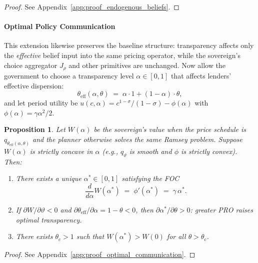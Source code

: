 \documentclass[12pt]{article}
\theoremstyle{plain}
\newtheorem{proposition}{Proposition}
\begin{document}
\begin{proof}
	See Appendix~\ref{app:proof_endogenous_beliefs}.
\end{proof}

\paragraph{Optimal Policy Communication}
This extension likewise preserves the baseline structure: transparency affects
only the \emph{effective} belief input into the same pricing operator, while
the sovereign's choice aggregator $J_\rho$ and other primitives are unchanged.
Now allow the government to choose a transparency level $\alpha\in[0,1]$ that
affects lenders' effective dispersion:
\begin{equation}
	\theta_{\mathrm{eff}}(\alpha,\theta)\;=\;\alpha\cdot 1 + (1-\alpha)\cdot \theta,
	\label{eq:effective_theta}
\end{equation}
and let period utility be $u(c,\alpha)=c^{1-\sigma}/(1-\sigma)-\phi(\alpha)$ with $\phi(\alpha)=\gamma\alpha^2/2$.

\begin{proposition}\label{prop:optimal_communication}
	Let $W(\alpha)$ be the sovereign's value when the price schedule is $q_{\theta_{\mathrm{eff}}(\alpha,\theta)}$ and the planner otherwise solves the same Ramsey problem. Suppose $W(\alpha)$ is strictly concave in $\alpha$ (e.g., $q_\vartheta$ is smooth and $\phi$ is strictly convex). Then:
	\begin{enumerate}
		\item[\textbf{(i)}] There exists a unique $\alpha^*\in[0,1]$ satisfying the FOC
		      \begin{equation}
			      \frac{d}{d\alpha}W(\alpha^*) \;=\; \phi'(\alpha^*) \;=\; \gamma\,\alpha^*.
			      \label{eq:foc_transparency}
		      \end{equation}
		\item[\textbf{(ii)}] If $\partial W/\partial \vartheta<0$ and $\partial \theta_{\mathrm{eff}}/\partial \alpha=1-\theta<0$, then $\partial \alpha^*/\partial \theta>0$: greater PRO raises optimal transparency.
		\item[\textbf{(iii)}] There exists $\theta_c>1$ such that $W(\alpha^*)>W(0)$ for all $\theta>\theta_c$.
	\end{enumerate}
\end{proposition}

\begin{proof}
	See Appendix~\ref{app:proof_optimal_communication}.
\end{proof}
\end{document}
